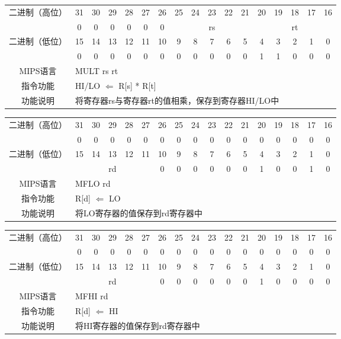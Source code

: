 \begin{table}
\begin{tabular}{|c|c|c|c|c|c|c|c|c|c|c|c|c|c|c|c|c|}
\hline
\multirow{2}{*}{二进制（高位）} &
31&30&29&28&27&26&25&24&23&22&21&20&19&18&17&16\\
\cline{2-17}
&0&0&0&0&0&0&
\multicolumn{5}{c|}{rs}&
\multicolumn{5}{c|}{rt}\\
\hline
\multirow{2}{*}{二进制（低位）} &
15&14&13&12&11&10&9&8&7&6&5&4&3&2&1&0\\
\cline{2-17}
&
0&0&0&0&0&0&0&0&0&0&0&1&1&0&0&0\\
\hline
MIPS语言&
\multicolumn{16}{l|}{MULT rs rt}\\
\hline
指令功能&
\multicolumn{16}{l|}{HI/LO $\Leftarrow$ R[s] * R[t]}\\
\hline
功能说明&
\multicolumn{16}{l|}{将寄存器rs与寄存器rt的值相乘，保存到寄存器HI/LO中}\\
\hline
\end{tabular}
\end{table}

\begin{table}
\begin{tabular}{|c|c|c|c|c|c|c|c|c|c|c|c|c|c|c|c|c|}
\hline
\multirow{2}{*}{二进制（高位）} &
31&30&29&28&27&26&25&24&23&22&21&20&19&18&17&16\\
\cline{2-17}
&0&0&0&0&0&0&0&0&0&0&0&0&0&0&0&0\\
\hline
\multirow{2}{*}{二进制（低位）} &
15&14&13&12&11&10&9&8&7&6&5&4&3&2&1&0\\
\cline{2-17}
&
\multicolumn{5}{c|}{rd}&
0&0&0&0&0&
0&1&0&0&1&
0\\
\hline
MIPS语言&
\multicolumn{16}{l|}{MFLO rd}\\
\hline
指令功能&
\multicolumn{16}{l|}{R[d] $\Leftarrow$ LO}\\
\hline
功能说明&
\multicolumn{16}{l|}{将LO寄存器的值保存到rd寄存器中}\\
\hline
\end{tabular}
\end{table}

\begin{table}
\begin{tabular}{|c|c|c|c|c|c|c|c|c|c|c|c|c|c|c|c|c|}
\hline
\multirow{2}{*}{二进制（高位）} &
31&30&29&28&27&26&25&24&23&22&21&20&19&18&17&16\\
\cline{2-17}
&0&0&0&0&0&0&0&0&0&0&0&0&0&0&0&0\\
\hline
\multirow{2}{*}{二进制（低位）} &
15&14&13&12&11&10&9&8&7&6&5&4&3&2&1&0\\
\cline{2-17}
&
\multicolumn{5}{c|}{rd}&
0&0&0&0&0&0&1&0&0&0&0\\
\hline
MIPS语言&
\multicolumn{16}{l|}{MFHI rd}\\
\hline
指令功能&
\multicolumn{16}{l|}{R[d] $\Leftarrow$ HI}\\
\hline
功能说明&
\multicolumn{16}{l|}{将HI寄存器的值保存到rd寄存器中}\\
\hline
\end{tabular}
\end{table}

